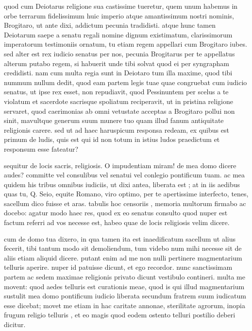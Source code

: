  quod cum Deiotarus religione sua castissime tueretur, quem unum habemus in orbe terrarum fidelissimum huic imperio atque amantissimum nostri nominis, Brogitaro, ut ante dixi, addictum pecunia tradidisti. atque hunc tamen Deiotarum saepe a senatu regali nomine dignum existimatum, clarissimorum imperatorum testimoniis ornatum, tu etiam regem appellari cum Brogitaro iubes. sed alter est rex iudicio senatus per nos, pecunia Brogitarus per te appellatus alterum putabo regem, si habuerit unde tibi solvat quod ei per syngrapham credidisti. nam cum multa regia sunt in Deiotaro tum illa maxime, quod tibi nummum nullum dedit, quod eam partem legis tuae quae congruebat cum iudicio senatus, ut ipse rex esset, non repudiavit, quod Pessinuntem per scelus a te violatum et sacerdote sacrisque spoliatum reciperavit, ut in pristina religione servaret, quod caerimonias ab omni vetustate acceptas a Brogitaro pollui non sinit, mavultque generum suum munere tuo quam illud fanum antiquitate religionis carere. sed ut ad haec haruspicum responsa redeam, ex quibus est primum de ludis, quis est qui id non totum in istius ludos praedictum et responsum esse fateatur?

 sequitur de locis sacris, religiosis. O impudentiam miram! de mea domo dicere audes? committe vel consulibus vel senatui vel conlegio pontificum tuam. ac mea quidem his tribus omnibus iudiciis, ut dixi antea, liberata est ; at in iis aedibus quas tu, Q. Seio, equite Romano, viro optimo, per te apertissime interfecto, tenes, sacellum dico fuisse et aras. tabulis hoc censoriis , memoria multorum firmabo ac docebo: agatur modo haec res, quod ex eo senatus consulto quod nuper est factum referri ad vos necesse est, habeo quae de locis religiosis velim dicere.

 cum de domo tua dixero, in qua tamen ita est inaedificatum sacellum ut alius fecerit, tibi tantum modo sit demoliendum, tum videbo num mihi necesse sit de aliis etiam aliquid dicere. putant enim ad me non nulli pertinere magmentarium telluris aperire. nuper id patuisse dicunt, et ego recordor. nunc sanctissimam partem ac sedem maximae religionis privato dicunt vestibulo contineri. multa me movent: quod aedes telluris est curationis meae, quod is qui illud magmentarium sustulit mea domo pontificum iudicio liberata secundum fratrem suum iudicatum esse dicebat; movet me etiam in hac caritate annonae, sterilitate agrorum, inopia frugum religio telluris , et eo magis quod eodem ostento telluri postilio deberi dicitur.

